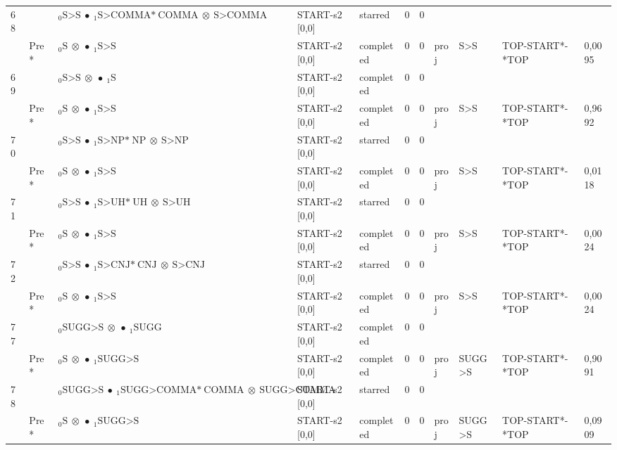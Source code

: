 \documentclass[10pt]{article}
\begin{document}
\begin{longtable}[htbp]{lllllllllll}
68 & & $ {}_0 \textrm{S>S} \  \bullet \ {}_{1} \textrm{S>COMMA*} \ \textrm{COMMA} \  \otimes \ \textrm{S>COMMA} $ & START-s2 [0,0] & starred & 0 & 0 & & & & \\ 
 & Pre *& $ {}_0 \textrm{S} \  \otimes \  \bullet \ {}_{1} \textrm{S>S} $ & START-s2 [0,0] & completed & 0 & 0 & proj & S>S & TOP-START*-*TOP & 0,0095 \\ 
69 & & $ {}_0 \textrm{S>S} \  \otimes \  \bullet \ {}_{1} \textrm{S} $ & START-s2 [0,0] & completed & 0 & 0 & & & & \\ 
 & Pre *& $ {}_0 \textrm{S} \  \otimes \  \bullet \ {}_{1} \textrm{S>S} $ & START-s2 [0,0] & completed & 0 & 0 & proj & S>S & TOP-START*-*TOP & 0,9692 \\ 
70 & & $ {}_0 \textrm{S>S} \  \bullet \ {}_{1} \textrm{S>NP*} \ \textrm{NP} \  \otimes \ \textrm{S>NP} $ & START-s2 [0,0] & starred & 0 & 0 & & & & \\ 
 & Pre *& $ {}_0 \textrm{S} \  \otimes \  \bullet \ {}_{1} \textrm{S>S} $ & START-s2 [0,0] & completed & 0 & 0 & proj & S>S & TOP-START*-*TOP & 0,0118 \\ 
71 & & $ {}_0 \textrm{S>S} \  \bullet \ {}_{1} \textrm{S>UH*} \ \textrm{UH} \  \otimes \ \textrm{S>UH} $ & START-s2 [0,0] & starred & 0 & 0 & & & & \\ 
 & Pre *& $ {}_0 \textrm{S} \  \otimes \  \bullet \ {}_{1} \textrm{S>S} $ & START-s2 [0,0] & completed & 0 & 0 & proj & S>S & TOP-START*-*TOP & 0,0024 \\ 
72 & & $ {}_0 \textrm{S>S} \  \bullet \ {}_{1} \textrm{S>CNJ*} \ \textrm{CNJ} \  \otimes \ \textrm{S>CNJ} $ & START-s2 [0,0] & starred & 0 & 0 & & & & \\ 
 & Pre *& $ {}_0 \textrm{S} \  \otimes \  \bullet \ {}_{1} \textrm{S>S} $ & START-s2 [0,0] & completed & 0 & 0 & proj & S>S & TOP-START*-*TOP & 0,0024 \\ 
77 & & $ {}_0 \textrm{SUGG>S} \  \otimes \  \bullet \ {}_{1} \textrm{SUGG} $ & START-s2 [0,0] & completed & 0 & 0 & & & & \\ 
 & Pre *& $ {}_0 \textrm{S} \  \otimes \  \bullet \ {}_{1} \textrm{SUGG>S} $ & START-s2 [0,0] & completed & 0 & 0 & proj & SUGG>S & TOP-START*-*TOP & 0,9091 \\ 
78 & & $ {}_0 \textrm{SUGG>S} \  \bullet \ {}_{1} \textrm{SUGG>COMMA*} \ \textrm{COMMA} \  \otimes \ \textrm{SUGG>COMMA} $ & START-s2 [0,0] & starred & 0 & 0 & & & & \\ 
 & Pre *& $ {}_0 \textrm{S} \  \otimes \  \bullet \ {}_{1} \textrm{SUGG>S} $ & START-s2 [0,0] & completed & 0 & 0 & proj & SUGG>S & TOP-START*-*TOP & 0,0909 \\ 

\end{longtable}
\end{document}
